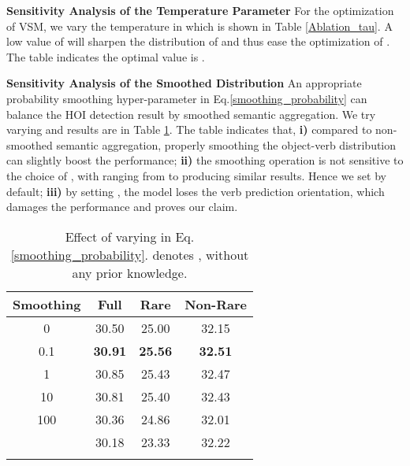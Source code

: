 \documentclass[letterpaper]{article} \usepackage{aaai22}  \usepackage{times}  \usepackage{helvet}  \usepackage{courier}  \usepackage[hyphens]{url}  \usepackage{graphicx} \urlstyle{rm} \def\UrlFont{\rm}  \usepackage{natbib}  \usepackage{caption} \DeclareCaptionStyle{ruled}{labelfont=normalfont,labelsep=colon,strut=off} \frenchspacing  \setlength{\pdfpagewidth}{8.5in}  \setlength{\pdfpageheight}{11in}  \usepackage{algorithm}
\begin{document}
\textbf{Sensitivity Analysis of the Temperature Parameter} For the optimization of VSM, we vary the temperature  in  which is shown in Table \ref{Ablation_tau}. A low value of  will sharpen the distribution of  and thus ease the optimization of . The table indicates the optimal value is .

\textbf{Sensitivity Analysis of the Smoothed Distribution} An appropriate probability smoothing hyper-parameter  in Eq.\ref{smoothing_probability} can balance the HOI detection result by smoothed semantic aggregation. We try varying  and results are in Table \ref{smoothing_beta}. The table indicates that, \textbf{i)} compared to non-smoothed semantic aggregation, properly smoothing the object-verb distribution can slightly boost the performance; \textbf{ii)} the smoothing operation is not sensitive to the choice of , with  ranging from  to  producing similar results. Hence we set  by default; \textbf{iii)} by setting , the model loses the verb prediction orientation, which damages the performance and proves our claim.


\begin{table}[t]
  \small
  \setlength{\tabcolsep}{5pt}
  \centering
    \begin{tabular}{c|ccc}
    \Xhline{1.0pt}
    \textbf{Smoothing } & \textbf{Full} & \textbf{Rare} & {\footnotesize \textbf{Non-Rare}} \\
    \hline
    \hline
    0  & 30.50  & 25.00  & 32.15  \\
    0.1  & \textbf{30.91} & \textbf{25.56} & \textbf{32.51} \\
    1  & 30.85  & 25.43  & 32.47  \\
    10  & 30.81  & 25.40  & 32.43  \\
    100  & 30.36  & 24.86  & 32.01  \\
     & 30.18 & 23.33  & 32.22 \\
    \Xhline{1.0pt}
    \end{tabular}\caption{Effect of varying  in Eq.\ref{smoothing_probability}.  denotes , without any prior knowledge.}
  \label{smoothing_beta}\end{table}
\end{document}
